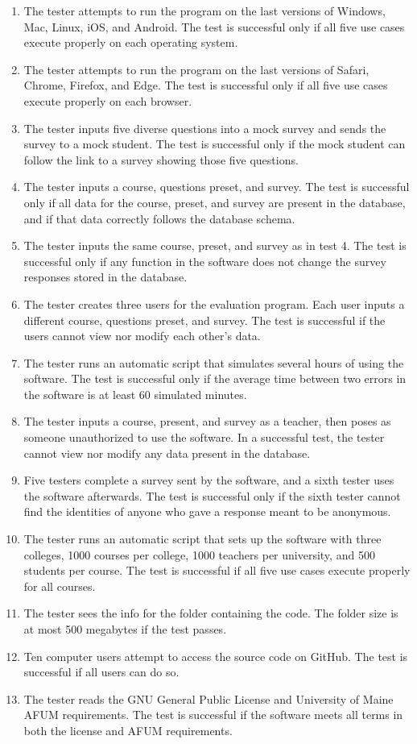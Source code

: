 \documentclass{article}
\begin{document}
\begin{enumerate}
  \item The tester attempts to run the program on the last versions of Windows, Mac, Linux, iOS, and Android. The test is successful only if all five use cases execute properly on each operating system.
  \item The tester attempts to run the program on the last versions of Safari, Chrome, Firefox, and Edge. The test is successful only if all five use cases execute properly on each browser.
  \item The tester inputs five diverse questions into a mock survey and sends the survey to a mock student. The test is successful only if the mock student can follow the link to a survey showing those five questions.
  \item The tester inputs a course, questions preset, and survey. The test is successful only if all data for the course, preset, and survey are present in the database, and if that data correctly follows the database schema.
  \item The tester inputs the same course, preset, and survey as in test 4. The test is successful only if any function in the software does not change the survey responses stored in the database.
  \item The tester creates three users for the evaluation program. Each user inputs a different course, questions preset, and survey. The test is successful if the users cannot view nor modify each other's data.
  \item The tester runs an automatic script that simulates several hours of using the software. The test is successful only if the average time between two errors in the software is at least 60 simulated minutes.
  \item The tester inputs a course, present, and survey as a teacher, then poses as someone unauthorized to use the software. In a successful test, the tester cannot view nor modify any data present in the database.
  \item Five testers complete a survey sent by the software, and a sixth tester uses the software afterwards. The test is successful only if the sixth tester cannot find the identities of anyone who gave a response meant to be anonymous.
  \item The tester runs an automatic script that sets up the software with three colleges, 1000 courses per college, 1000 teachers per university, and 500 students per course. The test is successful if all five use cases execute properly for all courses.
  \item The tester sees the info for the folder containing the code. The folder size is at most 500 megabytes if the test passes.
  \item Ten computer users attempt to access the source code on GitHub. The test is successful if all users can do so.
  \item The tester reads the GNU General Public License and University of Maine AFUM requirements. The test is successful if the software meets all terms in both the license and AFUM requirements.
\end{enumerate}
\end{document}
